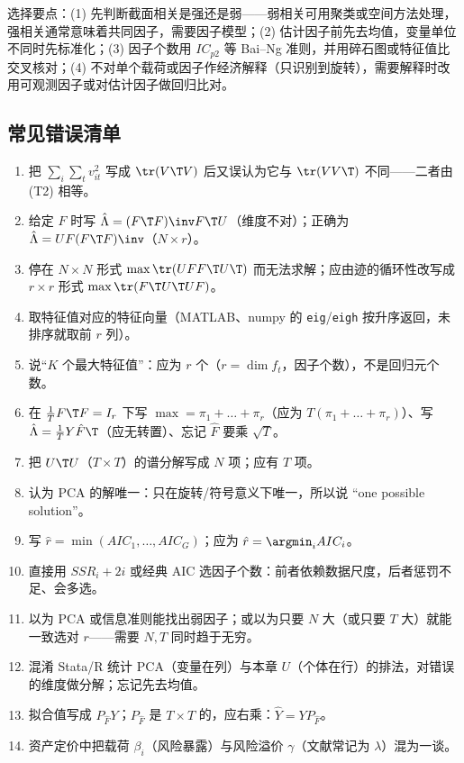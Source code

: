 选择要点：(1) 先判断截面相关是强还是弱——弱相关可用聚类或空间方法处理，强相关通常意味着共同因子，需要因子模型；(2) 估计因子前先去均值，变量单位不同时先标准化；(3) 因子个数用 $IC_{p2}$ 等 Bai--Ng 准则，并用碎石图或特征值比交叉核对；(4) 不对单个载荷或因子作经济解释（只识别到旋转），需要解释时改用可观测因子或对估计因子做回归比对。

\subsection{常见错误清单}

\begin{enumerate}
\item 把 $\sum_i\sum_tv_{it}^2$ 写成 $\tr(V\T V)$ 后又误认为它与 $\tr(VV\T)$ 不同——二者由 (T2) 相等。
\item 给定 $F$ 时写 $\hat\Lambda=(F\T F)\inv F\T U$（维度不对）；正确为 $\hat\Lambda=UF(F\T F)\inv$（$N\times r$）。
\item 停在 $N\times N$ 形式 $\max\tr(UFF\T U\T)$ 而无法求解；应由迹的循环性改写成 $r\times r$ 形式 $\max\tr(F\T U\T UF)$。
\item 取特征值对应的特征向量（MATLAB、numpy 的 \texttt{eig}/\texttt{eigh} 按升序返回，未排序就取前 $r$ 列）。
\item 说“$K$ 个最大特征值”：应为 $r$ 个（$r=\dim f_t$，因子个数），不是回归元个数。
\item 在 $\frac1TF\T F=I_r$ 下写 $\max=\pi_1+\dots+\pi_r$（应为 $T(\pi_1+\dots+\pi_r)$）、写 $\hat\Lambda=\frac1TY\hat F\T$（应无转置）、忘记 $\hat F$ 要乘 $\sqrt T$。
\item 把 $U\T U$（$T\times T$）的谱分解写成 $N$ 项；应有 $T$ 项。
\item 认为 PCA 的解唯一：只在旋转/符号意义下唯一，所以说 “one possible solution”。
\item 写 $\hat r=\min(AIC_1,\dots,AIC_G)$；应为 $\hat r=\argmin_iAIC_i$。
\item 直接用 $SSR_i+2i$ 或经典 AIC 选因子个数：前者依赖数据尺度，后者惩罚不足、会多选。
\item 以为 PCA 或信息准则能找出弱因子；或以为只要 $N$ 大（或只要 $T$ 大）就能一致选对 $r$——需要 $N,T$ 同时趋于无穷。
\item 混淆 Stata/R 统计 PCA（变量在列）与本章 $U$（个体在行）的排法，对错误的维度做分解；忘记先去均值。
\item 拟合值写成 $P_{\hat F}Y$；$P_{\hat F}$ 是 $T\times T$ 的，应右乘：$\hat Y=YP_{\hat F}$。
\item 资产定价中把载荷 $\beta_i$（风险暴露）与风险溢价 $\gamma$（文献常记为 $\lambda$）混为一谈。
\end{enumerate}

